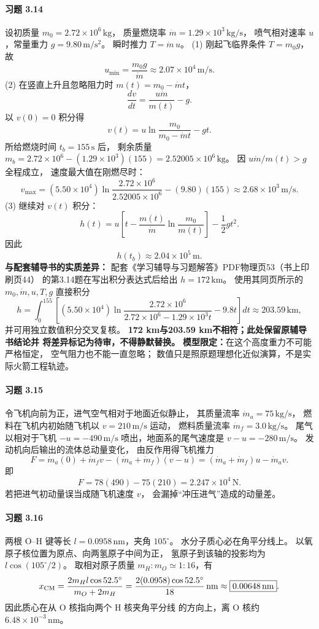 \paragraph{习题 3.14}
设初质量 \(m_0=2.72\times10^6\,\mathrm{kg}\)，
质量燃烧率
\(\dot m=1.29\times10^3\,\mathrm{kg/s}\)，
喷气相对速率 \(u\)，常量重力
\(g=9.80\,\mathrm{m/s^2}\)。
瞬时推力 \(T=\dot m\,u\)。
(1) 刚起飞临界条件 \(T=m_0g\)，故
\[
 \boxed{u_{\min}=\frac{m_0g}{\dot m}
 \approx2.07\times10^4\,\mathrm{m/s}}.
\]
(2) 在竖直上升且忽略阻力时
\(m(t)=m_0-\dot mt\)，
\[
 \frac{dv}{dt}=\frac{u\dot m}{m(t)}-g.
\]
以 \(v(0)=0\) 积分得
\[
 v(t)=u\ln\frac{m_0}{m_0-\dot mt}-gt.
\]
所给燃烧时间 \(t_b=155\,\mathrm s\) 后，
剩余质量
\(m_b=2.72\times10^6-(1.29\times10^3)(155)
=2.52005\times10^6\,\mathrm{kg}\)。
因 \(u\dot m/m(t)>g\) 全程成立，
速度最大值在刚燃尽时：
\[
 \boxed{v_{\max}
 =(5.50\times10^4)\ln\frac{2.72\times10^6}{2.52005\times10^6}
 -(9.80)(155)
 \approx2.68\times10^3\,\mathrm{m/s}}.
\]
(3) 继续对 \(v(t)\) 积分：
\[
 h(t)=u\left[t-\frac{m(t)}{\dot m}
 \ln\frac{m_0}{m(t)}\right]
 -\frac12gt^2.
\]
因此
\[
 \boxed{h(t_b)\approx2.04\times10^5\,\mathrm m}.
\]
\textbf{与配套辅导书的实质差异：}
配套《学习辅导与习题解答》PDF物理页53（书上印刷页44）
的第3.14题在写出积分表达式后给出 \(h=172\,\mathrm{km}\)。
使用其同页所示的 \(m_0,\dot m,u,T,g\) 直接积分
\[
 h=\int_0^{155}\left[
 (5.50\times10^4)\ln
 \frac{2.72\times10^6}{2.72\times10^6-1.29\times10^3t}
 -9.8t\right]dt
 \approx203.59\,\mathrm{km},
\]
并可用独立数值积分交叉复核。
\textbf{172 km与203.59 km不相符；此处保留原辅导书结论并
将差异标记为待审，不得静默替换。}
\textbf{模型限定：}在这个高度重力不可能严格恒定，
空气阻力也不能一直忽略；
数值只是照原题理想化近似演算，不是实际火箭工程轨迹。

\paragraph{习题 3.15}
令飞机向前为正，进气空气相对于地面近似静止，
其质量流率 \(\dot m_a=75\,\mathrm{kg/s}\)，
燃料在飞机内初始随飞机以 \(v=210\,\mathrm{m/s}\) 运动，
燃料质量流率 \(\dot m_f=3.0\,\mathrm{kg/s}\)。
尾气以相对于飞机 \(-u=-490\,\mathrm{m/s}\)
喷出，地面系的尾气速度是 \(v-u=-280\,\mathrm{m/s}\)。
发动机向后输出的流体总动量变化，
由反作用得飞机推力
\[
 F=\dot m_a(0)+\dot m_fv
 -(\dot m_a+\dot m_f)(v-u)
 =(\dot m_a+\dot m_f)u-\dot m_av.
\]
即
\[
 \boxed{F=78(490)-75(210)
 =2.247\times10^4\,\mathrm N}.
\]
若把进气初动量误当成随飞机速度 \(v\)，
会漏掉“冲压进气”造成的动量差。

\paragraph{习题 3.16}
两根 O--H 键等长
\(l=0.0958\,\mathrm{nm}\)，夹角 \(105^\circ\)。
水分子质心必在角平分线上。
以氧原子核位置为原点、向两氢原子中间为正，
氢原子到该轴的投影均为
\(l\cos(105^\circ/2)\)。
取相对原子质量 \(m_H:m_O\simeq1:16\)，有
\[
 x_{\rm CM}=
 \frac{2m_Hl\cos52.5^\circ}{m_O+2m_H}
 =\frac{2(0.0958)\cos52.5^\circ}{18}\,\mathrm{nm}
 \approx\boxed{0.00648\,\mathrm{nm}}.
\]
因此质心在从 O 核指向两个 H 核夹角平分线
的方向上，离 O 核约 \(6.48\times10^{-3}\,\mathrm{nm}\)。

